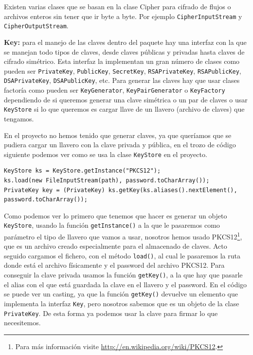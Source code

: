 Existen varias clases que se basan en la clase Cipher para cifrado de flujos o archivos enteros sin tener que ir byte a byte. Por ejemplo \lstinline{CipherInputStream} y \lstinline{CipherOutputStream}. 

\textbf{Key:} para el manejo de las claves dentro del paquete hay una interfaz con la que se manejan todo tipos de claves, desde claves públicas y privadas hasta claves de cifrado simétrico. Esta interfaz la implementan un gran número de clases como pueden ser \lstinline{PrivateKey}, \lstinline{PublicKey}, \lstinline{SecretKey}, \lstinline{RSAPrivateKey}, \lstinline{RSAPublicKey}, \lstinline{DSAPrivateKey}, \lstinline{DSAPublicKey}, etc. Para generar las claves hay que usar clases factoría como pueden ser \lstinline{KeyGenerator}, \lstinline{KeyPairGenerator} o \lstinline{KeyFactory} dependiendo de si queremos generar una clave simétrica o un par de claves o usar \lstinline{KeyStore} si lo que queremos es cargar llave de un llavero (archivo de claves) que tengamos.

En el proyecto no hemos tenido que generar claves, ya que queríamos que se pudiera cargar un llavero con la clave privada y pública, en el trozo de código siguiente podemos ver como se usa la clase \lstinline{KeyStore} en el proyecto.

\begin{lstlisting}[style=Java] 
KeyStore ks = KeyStore.getInstance("PKCS12");
ks.load(new FileInputStream(path), password.toCharArray());
PrivateKey key = (PrivateKey) ks.getKey(ks.aliases().nextElement(), password.toCharArray());
\end{lstlisting}

Como podemos ver lo primero que tenemos que hacer es generar un objeto \lstinline{KeyStore}, usando la función \lstinline{getInstance()} a la que le pasaremos como parámetro el tipo de llavero que vamos a usar, nosotros hemos usado PKCS12\footnote{Para más información visite \url{http://en.wikipedia.org/wiki/PKCS12}.}, que es un archivo creado especialmente para el almacenado de claves. Acto seguido cargamos el fichero, con el método \lstinline{load()}, al cual le pasaremos la ruta donde está el archivo físicamente y el password del archivo PKCS12. Para conseguir la clave privada usamos la función \lstinline{getKey()}, a la que hay que pasarle el alias con el que está guardada la clave en el llavero y el password. En el código se puede ver un casting, ya que la función \lstinline{getKey()} devuelve un elemento que implementa la interfaz \lstinline{Key}, pero nosotros sabemos que es un objeto de la clase \lstinline{PrivateKey}. De esta forma ya podemos usar la clave para firmar lo que necesitemos.

